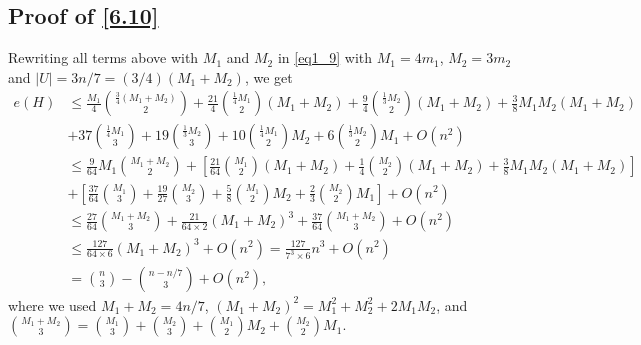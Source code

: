\documentclass[11pt, reqno]{amsart}    	%
\theoremstyle{definition}
\numberwithin{equation}{section}
\begin{document}
\begin{appendix}
	
	
		
	
	
	\section{Proof of \eqref{6.10}}
Rewriting all terms above with $M_1$ and $M_2$ in \eqref{eq1_9} with  $M_1=4m_1$, $M_2=3m_2$ and $|U|=3n/7=(3/4)(M_1+M_2)$, we get
	\begin{align*}	
	e(H)&\le \frac{M_1}{4}\binom{\frac{3}{4}(M_1+M_2)}{2}+\frac{21}{4}\binom{\frac{1}{4}M_1}{2}(M_1+M_2)+\frac{9}{4}\binom{\frac{1}{3}M_2}{2}(M_1+M_2)+\frac{3}{8}M_1M_2(M_1+M_2)\\&+37\binom{\frac{1}{4}M_1}{3}+19\binom{\frac{1}{3}M_2}{3}+10\binom{\frac{1}{4}M_1}{2}M_2+6\binom{\frac{1}{3}M_2}{2}M_1+O(n^2)\\&\le\frac{9}{64}M_1\binom{M_1+M_2}{2}+\left[\frac{21}{64}\binom{M_1}{2}(M_1+M_2)+\frac{1}{4}\binom{M_2}{2}(M_1+M_2)+\frac{3}{8}M_1M_2(M_1+M_2)\right]\\&+\left[\frac{37}{64} \binom{M_1}{3}+\frac{19}{27}\binom{M_2}{3}+\frac{5}{8}\binom{M_1}{2}M_2+\frac{2}{3}\binom{M_2}{2}M_1\right]+O(n^2)\\&\le\frac{27}{64}\binom{M_1+M_2}{3}+\frac{21}{64\times 2}(M_1+M_2)^3+\frac{37}{64}\binom{M_1+M_2}{3}+O(n^2)\\&\le \frac{127}{64\times 6}(M_1+M_2)^3 + O(n^2)= \frac{127}{7^3\times 6}n^3+O(n^2) \\&= \binom{n}{3}-\binom{n- n/7}{3}+O(n^2), 
\end{align*}
where we used $M_1+M_2=4n/7$, $(M_1+M_2)^2=M_{1}^{2}+M_{2}^{2}+2M_{1}M_{2}$, and $ \binom{M_1+M_2}{3}=\binom{M_1}{3}+\binom{M_2}{3}+\binom{M_1}{2}M_2+\binom{M_2}{2}M_1 $.
\end{appendix}
\end{document}
